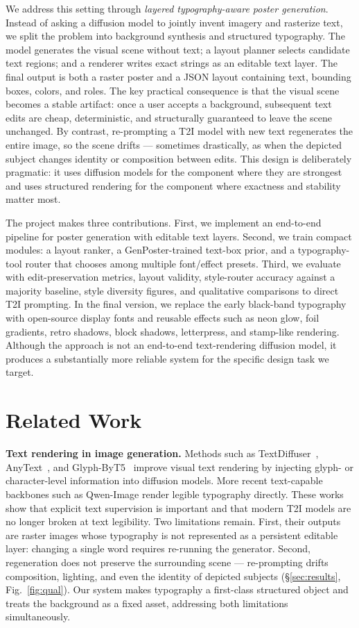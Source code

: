 \documentclass[10pt,twocolumn,letterpaper]{article}
\begin{document}
We address this setting through \emph{layered typography-aware poster generation}. Instead of asking a diffusion model to jointly invent imagery and rasterize text, we split the problem into background synthesis and structured typography. The model generates the visual scene without text; a layout planner selects candidate text regions; and a renderer writes exact strings as an editable text layer. The final output is both a raster poster and a JSON layout containing text, bounding boxes, colors, and roles. The key practical consequence is that the visual scene becomes a stable artifact: once a user accepts a background, subsequent text edits are cheap, deterministic, and structurally guaranteed to leave the scene unchanged. By contrast, re-prompting a T2I model with new text regenerates the entire image, so the scene drifts --- sometimes drastically, as when the depicted subject changes identity or composition between edits. This design is deliberately pragmatic: it uses diffusion models for the component where they are strongest and uses structured rendering for the component where exactness and stability matter most.

The project makes three contributions. First, we implement an end-to-end pipeline for poster generation with editable text layers. Second, we train compact modules: a layout ranker, a GenPoster-trained text-box prior, and a typography-tool router that chooses among multiple font/effect presets. Third, we evaluate with edit-preservation metrics, layout validity, style-router accuracy against a majority baseline, style diversity figures, and qualitative comparisons to direct T2I prompting. In the final version, we replace the early black-band typography with open-source display fonts and reusable effects such as neon glow, foil gradients, retro shadows, block shadows, letterpress, and stamp-like rendering. Although the approach is not an end-to-end text-rendering diffusion model, it produces a substantially more reliable system for the specific design task we target.

\section{Related Work}

\textbf{Text rendering in image generation.} Methods such as TextDiffuser~\cite{chen2023textdiffuser}, AnyText~\cite{tuo2024anytext}, and Glyph-ByT5~\cite{liu2024glyphbyt5} improve visual text rendering by injecting glyph- or character-level information into diffusion models. More recent text-capable backbones such as Qwen-Image render legible typography directly. These works show that explicit text supervision is important and that modern T2I models are no longer broken at text legibility. Two limitations remain. First, their outputs are raster images whose typography is not represented as a persistent editable layer: changing a single word requires re-running the generator. Second, regeneration does not preserve the surrounding scene --- re-prompting drifts composition, lighting, and even the identity of depicted subjects (\S\ref{sec:results}, Fig.~\ref{fig:qual}). Our system makes typography a first-class structured object and treats the background as a fixed asset, addressing both limitations simultaneously.
\end{document}
